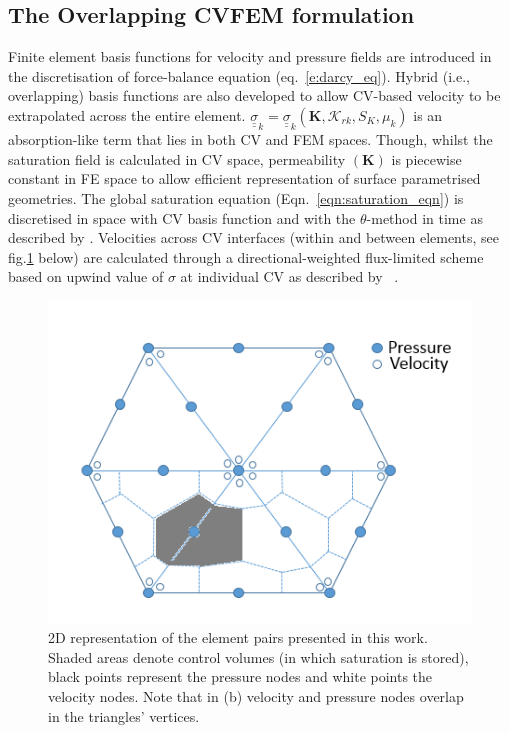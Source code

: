 \documentclass[preprint,authoryear,12pt]{elsarticle}
\begin{document}
\subsection{The Overlapping CVFEM formulation}
\medskip
Finite element basis functions for velocity and pressure fields are introduced in the discretisation of force-balance equation (eq.~\ref{e:darcy_eq}). Hybrid (i.e., overlapping) basis functions are also developed to allow CV-based velocity to be extrapolated across the entire element. $\underline{\underline{\sigma}}_{k}=\underline{\underline{\sigma}}_{k}\left({\mathbf K}, \mathcal{K}_{rk}, S_{K}, \mu_{k}\right)$ is an absorption-like term that lies in both CV and FEM spaces. Though, whilst the saturation field is calculated in CV space, permeability $\left({\mathbf K}\right)$ is piecewise constant in FE space to allow efficient representation of surface parametrised geometries. The global saturation equation (Eqn.~\ref{eqn:saturation_eqn}) is discretised in space with CV basis function and with the $\theta$-method in time as described by \citet{gomes_book_2012}. Velocities across CV interfaces (within and between elements, see fig.\ref{fig:fem_cv} below) are calculated through a directional-weighted flux-limited scheme based on upwind value of $\sigma$ at individual CV as described by \citet{gomes_2013}~\citep[see also][]{jackson_2013}.

\begin{figure}[h]
\centering
\includegraphics[width=.5\textwidth]{./Pics/P1DGP2.PNG}
\caption{2D representation of the element pairs presented in this work. Shaded areas denote control volumes (in which saturation is stored), black points represent the pressure nodes and white points the velocity nodes. Note that in (b) velocity and pressure nodes overlap in the triangles' vertices.}
\label{fig:fem_cv}
\end{figure}
\end{document}
